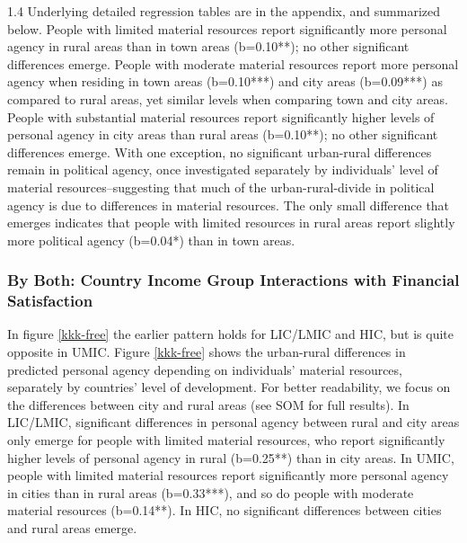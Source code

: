 \documentclass[10pt, letterpaper]{article}
\begin{document}
\begin{spacing}{1.4}
 Underlying detailed regression tables are in the appendix, and summarized
 below. 
People with limited material resources report significantly more personal agency
in rural areas than in town areas (b=0.10**); no other significant differences
emerge.
People with moderate material resources report more personal agency when
residing in town areas (b=0.10***) and city areas (b=0.09***) as compared to
rural areas, yet similar levels when comparing town and city areas.
%
People with substantial material resources report significantly higher levels of
personal agency in city areas than rural areas (b=0.10**); no other significant
differences emerge.
%
With one exception, no significant urban-rural differences remain in political agency, once
investigated separately by individuals' level of material resources--suggesting
that much of the urban-rural-divide in political agency is due to differences in
material resources.
The only small difference that emerges indicates that people with limited
resources in rural areas report slightly more political agency (b=0.04*) than in
town areas.



\subsubsection{By Both: Country Income Group Interactions with Financial
  Satisfaction} %

In figure \ref{kkk-free} the earlier pattern holds for LIC/LMIC and HIC, but is quite opposite
in UMIC.
Figure \ref{kkk-free} shows the urban-rural differences in predicted personal
agency depending on individuals' material resources, separately by countries'
level of development. For better readability, we focus on the differences
between city and rural areas (see SOM for full results).
In LIC/LMIC, significant differences in personal agency between rural and city
areas only emerge for people with limited material resources, who report
significantly higher levels of personal agency in rural (b=0.25**) than in city
areas. In UMIC, people with limited material resources report significantly more
personal agency in cities than in rural areas (b=0.33***), and so do people with
moderate material resources (b=0.14**). In HIC, no significant differences
between cities and rural areas emerge.



\end{spacing}
\end{document}
